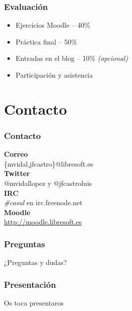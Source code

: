 \documentclass{beamer}
\begin{document}
\begin{frame}
  \frametitle{Evaluación}
  \begin{itemize}
    \item Ejercicios Moodle -- 40\%
    \item Práctica final -- 50\%
    \item Entradas en el blog -- 10\% \textit{(opcional)}
    \item Participación y asistencia
  \end{itemize}
\end{frame}


\section{Contacto}
\begin{frame}
  \frametitle{Contacto}
  \textbf{Correo}\\
  \hspace{0.3cm}\{mvidal,jfcastro\}@libresoft.es\\
  \vspace{0.3cm}
  \textbf{Twitter}\\
  \hspace{0.3cm}@mvidallopez y @jfcastroluis\\
  \vspace{0.3cm}
  \textbf{IRC}\\
  \hspace{0.3cm}\textit{\#casul} en irc.freenode.net\\
  \vspace{0.3cm}
  \textbf{Moodle}\\
  \hspace{0.3cm}\url{http://moodle.libresoft.es}
\end{frame}

\begin{frame}
  \frametitle{Preguntas}
  \begin{center}
    \huge{¿Preguntas y dudas?}
  \end{center}
\end{frame}

\begin{frame}
  \frametitle{Presentación}
  \begin{center}
    \huge{Os toca presentaros}
  \end{center}
\end{frame}

\end{document}
